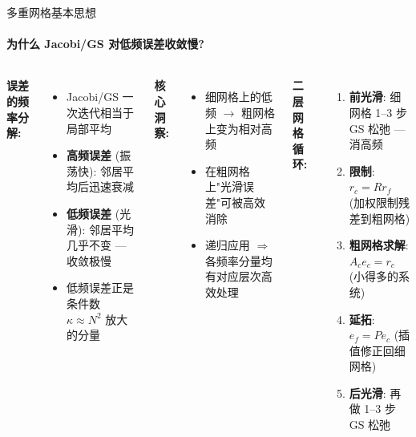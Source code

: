 \documentclass[12pt,aspectratio=169]{beamer}
\begin{document}
\begin{frame}[shrink]{多重网格基本思想}
\framesubtitle{为什么 Jacobi/GS 对低频误差收敛慢?}

\begin{columns}[T]
\textbf{误差的频率分解:}
\begin{itemize}\itemsep1pt
  \item Jacobi/GS 一次迭代相当于局部平均
  \item \textbf{高频误差} (振荡快): 邻居平均后迅速衰减
  \item \textbf{低频误差} (光滑): 邻居平均几乎不变 — 收敛极慢
  \item 低频误差正是条件数 $\kappa \approx N^2$ 放大的分量
\end{itemize}

\vspace{4pt}
\textbf{核心洞察:}
\begin{itemize}\itemsep1pt
  \item 细网格上的低频 $\to$ 粗网格上变为相对高频
  \item 在粗网格上"光滑误差"可被高效消除
  \item 递归应用 $\Rightarrow$ 各频率分量均有对应层次高效处理
\end{itemize}

\textbf{二层网格循环:}
\begin{enumerate}\itemsep0pt\footnotesize
  \item \textbf{前光滑}: 细网格 1--3 步 GS 松弛 — 消高频
  \item \textbf{限制}: $r_c = R r_f$ (加权限制残差到粗网格)
  \item \textbf{粗网格求解}: $A_c e_c = r_c$ (小得多的系统)
  \item \textbf{延拓}: $e_f = P e_c$ (插值修正回细网格)
  \item \textbf{后光滑}: 再做 1--3 步 GS 松弛
\end{enumerate}
	\end{columns}


\end{frame}
\end{document}
